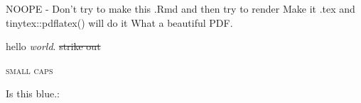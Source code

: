 \documentclass{article}
\begin{document}
NOOPE - Don't try to make this .Rmd and then try to render
Make it .tex and tinytex::pdflatex() will do it
What a beautiful PDF.

hello \emph{world}.
\sout{strike out}

\textsc{small caps}

\color{blue}   Is this blue.:   

\end{document}
